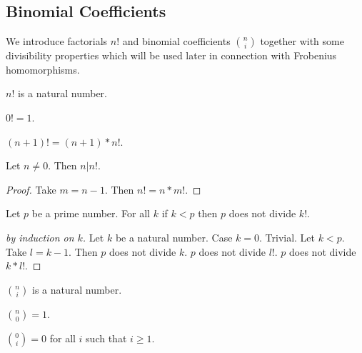 \documentclass[11pt]{article}
\begin{document}
\subsection{Binomial Coefficients}

\newcommand{\cho}[2]{{#1 \choose #2}}

We introduce factorials $n!$ and binomial coefficients
$\cho{n}{i}$ together with some divisibility properties
which will be used later in connection with
Frobenius homomorphisms.

\newcommand{\fac}[1]{#1 !}

\begin{forthel}

\begin{signature}
$\fac{n}$ is a natural number.
\end{signature}

\begin{axiom}
$\fac{0} = 1$.
\end{axiom}

\begin{axiom}
$\fac{(n+1)} = (n+1) * \fac{n}$.
\end{axiom}

\begin{lemma} Let $n \neq 0$. Then $n | \fac{n}$.
\end{lemma}
\begin{proof}
Take $m = n - 1$.
Then $\fac{n} = n * \fac{m}$.
\end{proof}

\begin{lemma}
Let $p$ be a prime number.
For all $k$ if $k < p$ then $p$ does not divide $\fac{k}$.
\end{lemma}
\begin{proof}[by induction on $k$]
Let $k$ be a natural number.
Case $k = 0$. Trivial.
Let $k < p$.
Take $l = k - 1$.
Then $p$ does not divide $k$. $p$ does not divide $\fac{l}$.
$p$ does not divide $k * \fac{l}$.
\end{proof}

\begin{signature}
$\cho{n}{i}$ is a natural number.
\end{signature}

\begin{axiom}
$\cho{n}{0} = 1$.
\end{axiom}

\begin{axiom}
$\cho{0}{i} = 0$ for all $i$ such that $i \geq 1$.
\end{axiom}


\end{forthel}
\end{document}
